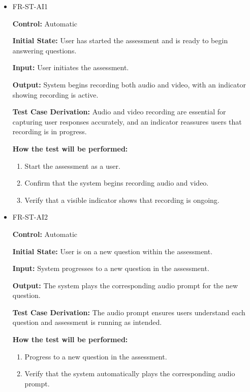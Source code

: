 \documentclass[12pt, titlepage]{article}
\begin{document}
\begin{itemize}
  \item FR-ST-AI1
    \begin{mdframed}[linewidth=0.5mm]
      \textbf{Control:} Automatic \par
      \textbf{Initial State:} User has started the assessment and is ready to begin answering questions. \par
      \textbf{Input:} User initiates the assessment. \par
      \textbf{Output:} System begins recording both audio and video, with an indicator showing recording is active. \par
      \textbf{Test Case Derivation:} Audio and video recording are essential for capturing user responses accurately, and an indicator reassures users that recording is in progress. \par
      \textbf{How the test will be performed:}
      \begin{enumerate}[noitemsep]
        \item Start the assessment as a user.
        \item Confirm that the system begins recording audio and video.
        \item Verify that a visible indicator shows that recording is ongoing.
      \end{enumerate}
    \end{mdframed}

  \item FR-ST-AI2
    \begin{mdframed}[linewidth=0.5mm]
      \textbf{Control:} Automatic \par
      \textbf{Initial State:} User is on a new question within the assessment. \par
      \textbf{Input:} System progresses to a new question in the assessment. \par
      \textbf{Output:} The system plays the corresponding audio prompt for the new question. \par
      \textbf{Test Case Derivation:} The audio prompt ensures users understand each question and assessment is running as intended. \par
      \textbf{How the test will be performed:}
      \begin{enumerate}[noitemsep]
        \item Progress to a new question in the assessment.
        \item Verify that the system automatically plays the corresponding audio prompt.
      \end{enumerate}
    \end{mdframed}


\end{itemize}
\end{document}
